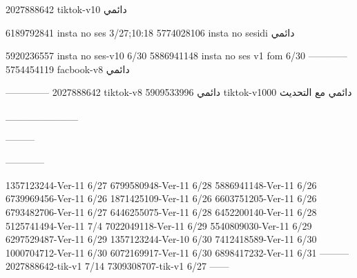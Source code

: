 2027888642 tiktok-v10
دائمي

6189792841 insta no ses
3/27;10:18
5774028106 insta no sesidi
دائمي


5920236557 insta no ses-v10
6/30
5886941148 insta no ses v1 fom
6/30
------------
5754454119 facbook-v8
دائمي


--------------
2027888642 tiktok-v8
دائمي
5909533996 tiktok-v1000
دائمي مع التحديث

__________

---------


------------

1357123244-Ver-11
6/27
6799580948-Ver-11
6/28
5886941148-Ver-11
6/26
6739969456-Ver-11
6/26
1871425109-Ver-11
6/26
6603751205-Ver-11
6/26
6793482706-Ver-11
6/27
6446255075-Ver-11
6/28
6452200140-Ver-11
6/28
5125741494-Ver-11
7/4
7022049118-Ver-11
6/29
5540809030-Ver-11
6/29
6297529487-Ver-11
6/29
1357123244-Ver-10
6/30
7412418589-Ver-11
6/30
1000704712-Ver-11
6/30
6072169917-Ver-11
6/30
6898417232-Ver-11
6/31
---------
2027888642-tik-v1
7/14
7309308707-tik-v1
6/27
------
